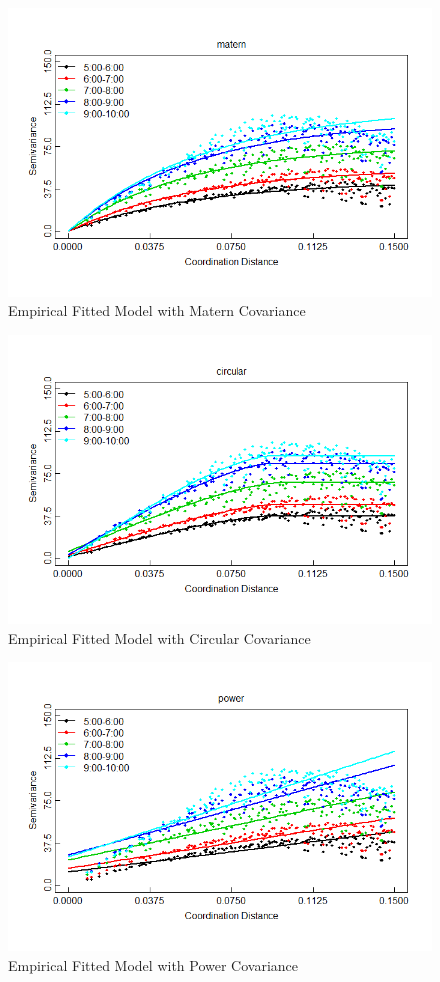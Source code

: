 \documentclass[hidelinks,12pt]{article}
\begin{document}
\FloatBarrier
	\begin{figure}[!ht]
		\includegraphics[width=\textwidth]{semfit_matern.png}
		\caption{Empirical Fitted Model with Matern Covariance \label{fig:semmat}}
	\end{figure}
\FloatBarrier
	\begin{figure}[!ht]
		\includegraphics[width=\textwidth]{semfit_circular.png}
		\caption{Empirical Fitted Model with Circular Covariance \label{fig:semcirh}}
	\end{figure}
\FloatBarrier
	\begin{figure}[!ht]
		\includegraphics[width=\textwidth]{semfit_power.png}
		\caption{Empirical Fitted Model with Power Covariance \label{fig:sempow}}
	\end{figure}
\end{document}
